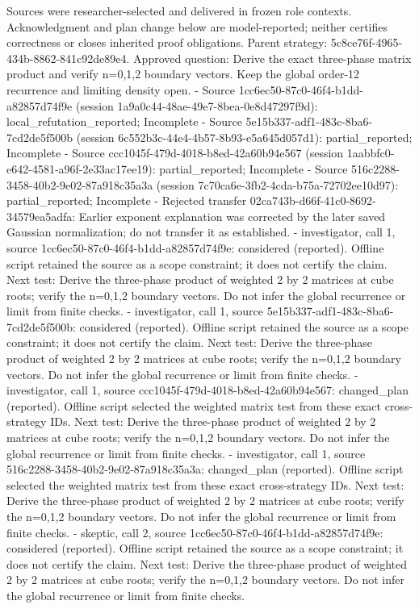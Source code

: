\documentclass[11pt]{article}
\begin{document}
Sources were researcher-selected and delivered in frozen role contexts. Acknowledgment and plan change below are model-reported; neither certifies correctness or closes inherited proof obligations.
Parent strategy: 5c8ce76f-4965-434b-8862-841c92de89e4. Approved question: Derive the exact three-phase matrix product and verify n=0,1,2 boundary vectors. Keep the global order-12 recurrence and limiting density open.
- Source 1cc6ec50-87c0-46f4-b1dd-a82857d74f9e (session 1a9a0c44-48ae-49e7-8bea-0e8d47297f9d): local\_refutation\_reported; Incomplete
- Source 5e15b337-adf1-483c-8ba6-7cd2de5f500b (session 6c552b3c-44e4-4b57-8b93-e5a645d057d1): partial\_reported; Incomplete
- Source ccc1045f-479d-4018-b8ed-42a60b94e567 (session 1aabbfc0-e642-4581-a96f-2e33ac17ee19): partial\_reported; Incomplete
- Source 516c2288-3458-40b2-9e02-87a918c35a3a (session 7c70ca6e-3fb2-4cda-b75a-72702ee10d97): partial\_reported; Incomplete
- Rejected transfer 02ca743b-d66f-41c0-8692-34579ea5adfa: Earlier exponent explanation was corrected by the later saved Gaussian normalization; do not transfer it as established.
- investigator, call 1, source 1cc6ec50-87c0-46f4-b1dd-a82857d74f9e: considered (reported). Offline script retained the source as a scope constraint; it does not certify the claim. Next test: Derive the three-phase product of weighted 2 by 2 matrices at cube roots; verify the n=0,1,2 boundary vectors. Do not infer the global recurrence or limit from finite checks.
- investigator, call 1, source 5e15b337-adf1-483c-8ba6-7cd2de5f500b: considered (reported). Offline script retained the source as a scope constraint; it does not certify the claim. Next test: Derive the three-phase product of weighted 2 by 2 matrices at cube roots; verify the n=0,1,2 boundary vectors. Do not infer the global recurrence or limit from finite checks.
- investigator, call 1, source ccc1045f-479d-4018-b8ed-42a60b94e567: changed\_plan (reported). Offline script selected the weighted matrix test from these exact cross-strategy IDs. Next test: Derive the three-phase product of weighted 2 by 2 matrices at cube roots; verify the n=0,1,2 boundary vectors. Do not infer the global recurrence or limit from finite checks.
- investigator, call 1, source 516c2288-3458-40b2-9e02-87a918c35a3a: changed\_plan (reported). Offline script selected the weighted matrix test from these exact cross-strategy IDs. Next test: Derive the three-phase product of weighted 2 by 2 matrices at cube roots; verify the n=0,1,2 boundary vectors. Do not infer the global recurrence or limit from finite checks.
- skeptic, call 2, source 1cc6ec50-87c0-46f4-b1dd-a82857d74f9e: considered (reported). Offline script retained the source as a scope constraint; it does not certify the claim. Next test: Derive the three-phase product of weighted 2 by 2 matrices at cube roots; verify the n=0,1,2 boundary vectors. Do not infer the global recurrence or limit from finite checks.
\end{document}

